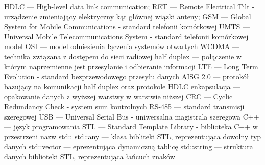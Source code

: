 \cleardoublepage
{}
{}
\noindent
HDLC --- High-level data link communication;\newline
RET --- Remote Electrical Tilt - urządzenie zmieniający elektryczny kąt głównej wiązki anteny;\newline
GSM --- Global System for Mobile Communications - standard telefonii komórkowej\newline
UMTS --- Universal Mobile Telecommunications System - standard telefonii komórkowej\newline
model OSI --- model odniesienia łączenia systemów otwartych\newline
WCDMA --- technika związana z dostępem do sieci radiowej\newline
half duplex --- połączenie w którym naprzemienne jest przesyłanie i odbieranie informacji\newline
LTE --- Long Term Evolution - standard bezprzewodowego przesyłu danych\newline
AISG 2.0 --- protokół bazujący na komunikacji half duplex oraz protokole HDLC\newline
enkapsulacja --- opakowanie danych z wyższej warstwy w warstwie niższej\newline
CRC --- Cyclic Redundancy Check - system sum kontrolnych\newline
RS-485 --- standard transmisji szeregowej\newline
USB --- Universal Serial Bus - uniwersalna magistrala szeregowa\newline
C++ --- język programowania\newline
STL --- Standard Template Library - biblioteka C++ w przestrzeni nazw std::\newline
std::any --- klasa bibliteki STL, reprezentująca dowolny typ danych\newline
std::vector --- eprezentująca dynamiczną tablicę\newline
std::string --- struktura danych biblioteki STL, reprezentująca łańcuch znaków\newline

\let\cleardoublepage\clearpage